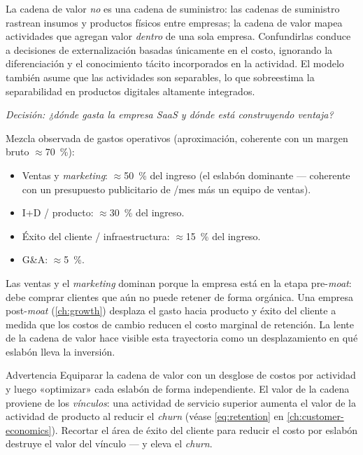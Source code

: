 La cadena de valor \emph{no} es una cadena de suministro: las cadenas de suministro rastrean
insumos y productos físicos entre empresas; la cadena de valor mapea actividades que agregan
valor \emph{dentro} de una sola empresa. Confundirlas conduce a decisiones de externalización
basadas únicamente en el costo, ignorando la diferenciación y el conocimiento tácito
incorporados en la actividad. El modelo también asume que las actividades son separables, lo
que sobreestima la separabilidad en productos digitales altamente integrados.

\begin{example}
\emph{Decisión: ¿dónde gasta la empresa SaaS y dónde está construyendo ventaja?}

Mezcla observada de gastos operativos (aproximación, coherente con un margen bruto
$\approx$\qty{70}{\percent}):
\begin{itemize}
  \item Ventas y \emph{marketing}: $\approx$\qty{50}{\percent} del ingreso
        (el eslabón dominante --- coherente con un presupuesto publicitario de /mes
        más un equipo de ventas).
  \item I+D / producto: $\approx$\qty{30}{\percent} del ingreso.
  \item Éxito del cliente / infraestructura: $\approx$\qty{15}{\percent} del ingreso.
  \item G\&A: $\approx$\qty{5}{\percent}.
\end{itemize}
Las ventas y el \emph{marketing} dominan porque la empresa está en la etapa pre-\emph{moat}:
debe comprar clientes que aún no puede retener de forma orgánica. Una empresa post-\emph{moat}
(\cref{ch:growth}) desplaza el gasto hacia producto y éxito del cliente a medida que los costos
de cambio reducen el costo marginal de retención. La lente de la cadena de valor hace visible
esta trayectoria como un desplazamiento en qué eslabón lleva la inversión.
\end{example}

\begin{admonition}{Advertencia}
Equiparar la cadena de valor con un desglose de costos por actividad y luego «optimizar» cada
eslabón de forma independiente. El valor de la cadena proviene de los \emph{vínculos}: una
actividad de servicio superior aumenta el valor de la actividad de producto al reducir el
\emph{churn} (véase \cref{eq:retention} en \cref{ch:customer-economics}). Recortar el área
de éxito del cliente para reducir el costo por eslabón destruye el valor del vínculo ---
y eleva el \emph{churn}.
\end{admonition}

